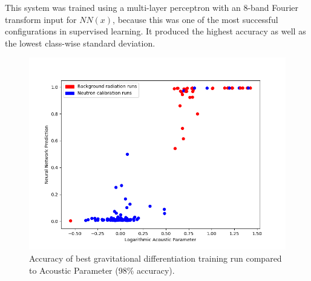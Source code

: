 \documentclass[10pt]{article}
\begin{document}
This system was trained using a multi-layer perceptron with an 8-band Fourier transform input for $NN(x)$, because this was one of the most successful configurations in supervised learning. It produced the highest accuracy as well as the lowest class-wise standard deviation.

\begin{figure}[H]
    \centering
    \includegraphics[width=\textwidth]{grav_opt_validation}
    \caption{\label{grav_opt_validation} Accuracy of best gravitational differentiation training run compared to Acoustic Parameter (98\% accuracy).}
\end{figure}
\end{document}
